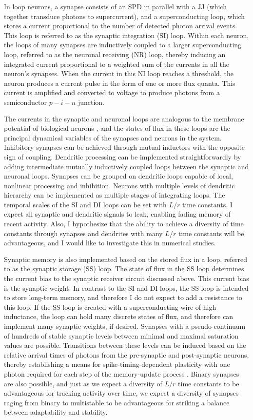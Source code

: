\documentclass[]{article}
\begin{document}
In loop neurons, a synapse consists of an SPD in parallel with a JJ (which together transduce photons to supercurrent), and a superconducting loop, which stores a current proportional to the number of detected photon arrival events. This loop is referred to as the synaptic integration (SI) loop. Within each neuron, the loops of many synapses are inductively coupled to a larger superconducting loop, referred to as the neuronal receiving (NR) loop, thereby inducing an integrated current proportional to a weighted sum of the currents in all the neuron's synapses. When the current in this NI loop reaches a threshold, the neuron produces a current pulse in the form of one or more flux quanta. This current is amplified and converted to voltage to produce photons from a semiconductor $p-i-n$ junction.

The currents in the synaptic and neuronal loops are analogous to the membrane potential of biological neurons \cite{daab2001,geki2002}, and the states of flux in these loops are the principal dynamical variables of the synapses and neurons in the system. Inhibitory synapses can be achieved through mutual inductors with the opposite sign of coupling. Dendritic processing can be implemented straightforwardly by adding intermediate mutually inductively coupled loops between the synaptic and neuronal loops. Synapses can be grouped on dendritic loops capable of local, nonlinear processing and inhibition. Neurons with multiple levels of dendritic hierarchy can be implemented as multiple stages of integrating loops. The temporal scales of the SI and DI loops can be set with $L/r$ time constants. I expect all synaptic and dendritic signals to leak, enabling fading memory of recent activity. Also, I hypothesize that the ability to achieve a diversity of time constants through synapses and dendrites with many $L/r$ time constants will be advantageous, and I would like to investigate this in numerical studies.

Synaptic memory is also implemented based on the stored flux in a loop, referred to as the synaptic storage (SS) loop. The state of flux in the SS loop determines the current bias to the synaptic receiver circuit discussed above. This current bias is the synaptic weight. In contrast to the SI and DI loops, the SS loop is intended to store long-term memory, and therefore I do not expect to add a resistance to this loop. If the SS loop is created with a superconducting wire of high inductance, the loop can hold many discrete states of flux, and therefore can implement many synaptic weights, if desired. Synapses with a pseudo-continuum of hundreds of stable synaptic levels between minimal and maximal saturation values are possible. Transitions between these levels can be induced based on the relative arrival times of photons from the pre-synaptic and post-synaptic neurons, thereby establishing a means for spike-timing-dependent plasticity with one photon required for each step of the memory-update process \cite{sh2019_jap}. Binary synapses are also possible, and just as we expect a diversity of $L/r$ time constants to be advantageous for tracking activity over time, we expect a diversity of synapses raging from binary to multistable to be advantageous for striking a balance between adaptability and stability.
\end{document}
